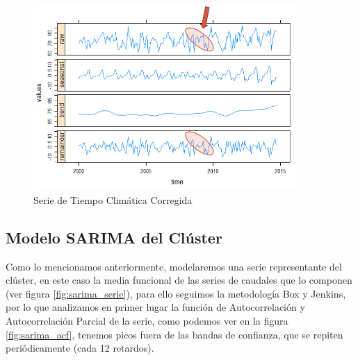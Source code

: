 \documentclass[12pt,oneside]{book}\usepackage[]{graphicx}\usepackage[]{color}
\theoremstyle{definition} %
\begin{document}
\begin{figure}[H]
\centering
\includegraphics[width=10cm]{Cap3-Metodologia/limpieza2.png}
\caption{Serie de Tiempo Climática Corregida}
\label{fig:climaLimp2}

\end{figure}


% 
% 
% 


\subsection{Modelo SARIMA del Clúster}

Como lo mencionamos anteriormente, modelaremos una serie representante del clúster, en este caso la media funcional de las series de caudales que lo componen (ver figura \ref{fig:sarima_serie}), para ello seguimos la metodología Box y Jenkins, por lo que analizamos en primer lugar la función de Autocorrelación y Autocorrelación Parcial de la serie, como podemos ver en la figura \ref{fig:sarima_acf}, tenemos picos fuera de las bandas de confianza, que se repiten periódicamente (cada 12 retardos). 
\end{document}
